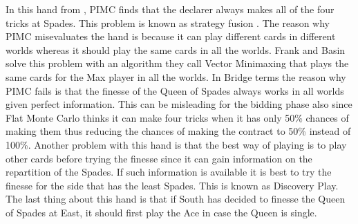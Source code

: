 \documentclass{ecai}
\begin{document}

\begin{handdiagram}
\end{handdiagram}

In this hand from \cite{ginsberg2001}, PIMC finds that the declarer
always makes all of the four tricks at Spades. This problem is known
as strategy fusion \cite{frank1998search}. The reason why PIMC
misevaluates the hand is because it can play different cards in
different worlds whereas it should play the same cards in all the
worlds. Frank and Basin solve this problem with an algorithm they call
Vector Minimaxing \cite{frank2001theoretical} that plays the same
cards for the Max player in all the worlds. In Bridge terms the reason
why PIMC fails is that the finesse of the Queen of Spades always works
in all worlds given perfect information. This can be misleading for
the bidding phase also since Flat Monte Carlo thinks it can make four
tricks when it has only 50\% chances of making them thus reducing the
chances of making the contract to 50\% instead of 100\%. Another
problem with this hand is that the best way of playing is to play
other cards before trying the finesse since it can gain information on
the repartition of the Spades. If such information is available it is
best to try the finesse for the side that has the least Spades. This
is known as Discovery Play. The last thing about this hand is that if
South has decided to finesse the Queen of Spades at East, it should
first play the Ace in case the Queen is single.

\begin{handdiagram}
\end{handdiagram}
\end{document}
